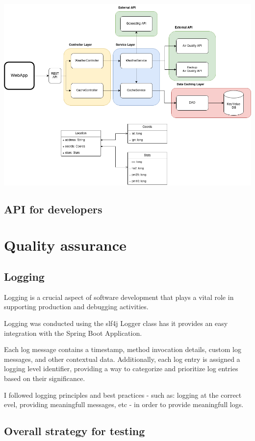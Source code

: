 \documentclass[12pt]{article}
\begin{document}
\includegraphics[scale=.4]{architecture.png}

\subsection{API for developers}

\section{Quality assurance}

\subsection{Logging}

Logging is a crucial aspect of software development that plays a vital role in supporting production and debugging activities. 

Logging was conducted using the slf4j Logger class has it provides an easy integration with the Spring Boot Application.

Each log message contains a timestamp, method invocation details, custom log messages, and other contextual data. Additionally, each log entry is assigned a logging level identifier, providing a way to categorize and prioritize log entries based on their significance.

I followed logging principles and best practices - such as: logging at the correct evel, providing meaningfull messages, etc - in order to provide meaningfull logs.

\subsection{Overall strategy for testing}
\end{document}
